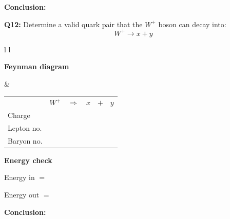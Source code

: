\documentclass[12pt]{article}
\begin{document}
\vspace{0.5cm}

\textbf{Conclusion:}

\vspace{2.5cm}

\newpage
\textbf{Q12:} Determine a valid quark pair that the $W^+$ boson can decay into:
\[
W^+ \rightarrow x + y
\]

\vspace{0.5cm}

\begin{tabular}{l l}

\begin{minipage}[t]{0.46\textwidth}
\vspace{0pt}
\textbf{Feynman diagram}

\vspace{0.6cm}

\begin{tikzpicture}
\begin{feynman}
  \vertex (W) at (0,2) {};
  \vertex [coordinate] (v) at (3,2) {};

  \vertex (x) at (4,4) {\(x\)};
  \vertex (y) at (5,3) {\(y\)};

  \diagram*{
    (W) -- [boson, edge label=\(W^+\), momentum'={}] (v),
    (v) -- [fermion] (x),
    (v) -- [fermion] (y),
  };
\end{feynman}
\end{tikzpicture}
\end{minipage}
&
\begin{minipage}[t]{0.50\textwidth}
\vspace{0pt}

\renewcommand{\arraystretch}{1.4}
\begin{tabular}{@{}l c c c c c@{}}
 & \(W^+\) & \(\Rightarrow\) & \(x\) & \(+\) & \(y\) \\
Charge &  &  &  &  &  \\
Lepton no. &  &  &  &  &  \\
Baryon no. &  &  &  &  &  \\
\end{tabular}

\vspace{0.6cm}

\textbf{Energy check}

Energy in $=$

Energy out $=$

\end{minipage}

\end{tabular}

\vspace{0.5cm}

\textbf{Conclusion:}

\vspace{2.5cm}
\end{document}
